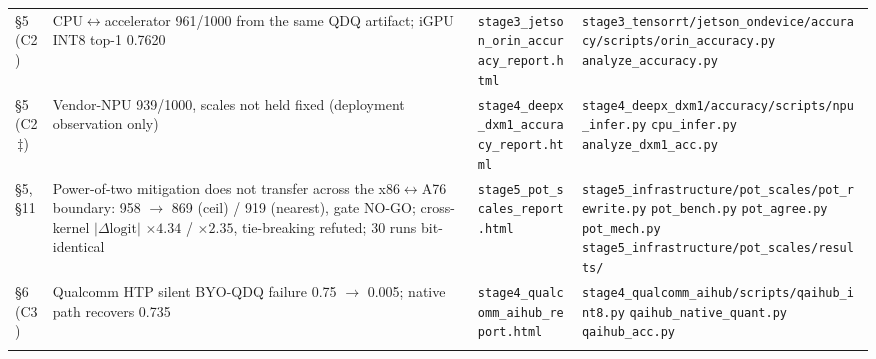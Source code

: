 \documentclass[11pt]{article}
\begin{document}
\begin{longtable}{L{0.9cm} L{4.0cm} L{4.3cm} L{5.0cm}}
\addlinespace[2pt]
\S5 (C2) & CPU$\leftrightarrow$accelerator 961/1000 from the same QDQ artifact; iGPU INT8 top-1 0.7620 & \texttt{stage3\_\allowbreak jetson\_\allowbreak orin\_\allowbreak accuracy\_\allowbreak report.html} & \texttt{stage3\_\allowbreak tensorrt/\allowbreak jetson\_\allowbreak ondevice/\allowbreak accuracy/\allowbreak scripts/\allowbreak orin\_\allowbreak accuracy.py} \newline \texttt{analyze\_\allowbreak accuracy.py} \\
\addlinespace[2pt]
\S5 (C2\,$\ddagger$) & Vendor-NPU 939/1000, scales not held fixed (deployment observation only) & \texttt{stage4\_\allowbreak deepx\_\allowbreak dxm1\_\allowbreak accuracy\_\allowbreak report.html} & \texttt{stage4\_\allowbreak deepx\_\allowbreak dxm1/\allowbreak accuracy/\allowbreak scripts/\allowbreak npu\_\allowbreak infer.py} \newline \texttt{cpu\_\allowbreak infer.py} \newline \texttt{analyze\_\allowbreak dxm1\_\allowbreak acc.py} \\
\addlinespace[2pt]
\S5, \S11 & Power-of-two mitigation does not transfer across the x86$\leftrightarrow$A76 boundary: 958 $\to$ 869 (ceil) / 919 (nearest), gate NO-GO; cross-kernel $|\Delta\mathrm{logit}|$ $\times4.34$ / $\times2.35$, tie-breaking refuted; 30 runs bit-identical & \texttt{stage5\_\allowbreak pot\_\allowbreak scales\_\allowbreak report.html} & \texttt{stage5\_\allowbreak infrastructure/\allowbreak pot\_\allowbreak scales/\allowbreak pot\_\allowbreak rewrite.py} \newline \texttt{pot\_\allowbreak bench.py} \newline \texttt{pot\_\allowbreak agree.py} \newline \texttt{pot\_\allowbreak mech.py} \newline \texttt{stage5\_\allowbreak infrastructure/\allowbreak pot\_\allowbreak scales/\allowbreak results/\allowbreak } \\
\addlinespace[2pt]
\S6 (C3) & Qualcomm HTP silent BYO-QDQ failure 0.75 $\to$ 0.005; native path recovers 0.735 & \texttt{stage4\_\allowbreak qualcomm\_\allowbreak aihub\_\allowbreak report.html} & \texttt{stage4\_\allowbreak qualcomm\_\allowbreak aihub/\allowbreak scripts/\allowbreak qaihub\_\allowbreak int8.py} \newline \texttt{qaihub\_\allowbreak native\_\allowbreak quant.py} \newline \texttt{qaihub\_\allowbreak acc.py} \\
\addlinespace[2pt]

\end{longtable}
\end{document}
